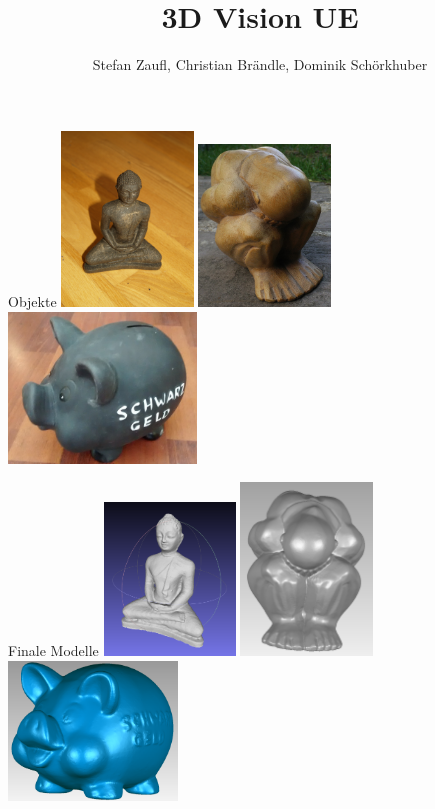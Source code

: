 \documentclass[11pt]{beamer}
\author{Stefan Zaufl, Christian Brändle, Dominik Schörkhuber}
\title{3D Vision UE}
\begin{document}
\begin{frame}
\titlepage
\end{frame}


\begin{frame}{Objekte}
	\includegraphics[width=3.5cm]{images/Budha/Budha_Original.jpg}
	\includegraphics[width=3.5cm]{images/Mann_Original.jpg}
	\includegraphics[width=5cm]{images/sparschwein/photo.jpg}
\end{frame}

\begin{frame}{Finale Modelle}
	\includegraphics[width=3.5cm]{./Images/Budha/Budha_SfM_Untextured.png}
	\includegraphics[width=3.5cm]{images/Mann_Front}
	\includegraphics[width=4.5cm]{images/sparschwein/final}
\end{frame}
\end{document}
